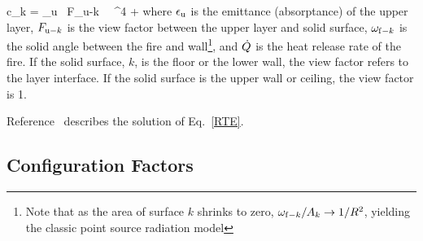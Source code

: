 \documentclass[12pt]{book}
\begin{document}
\be
   c_k = \epsilon_{\rm u} \, F_{{\rm u}-k} \, \sigma \, \Tu^4 +    \label{ckeq}
\ee
where $\epsilon_{\rm u}$ is the emittance (absorptance) of the upper layer, $F_{{\rm u}-k}$ is the view factor between the upper layer and solid surface, $\omega_{{\rm f}-k}$ is the solid angle between the fire and wall\footnote{Note that as the area of surface $k$ shrinks to zero, $\omega_{{\rm f}-k}/A_k \to 1/R^2$, yielding the classic point source radiation model}, and $\dot{Q}$ is the heat release rate of the fire. If the solid surface, $k$, is the floor or the lower wall, the view factor refers to the layer interface. If the solid surface is the upper wall or ceiling, the view factor is 1.

Reference~\cite{Forney_radiation} describes the solution of Eq.~\ref{RTE}.


\subsection{Configuration Factors}
\end{document}
